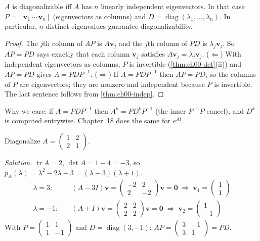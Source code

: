 \begin{theorem}\label{thm:ch00-diag}
$A$ is diagonalizable iff $A$ has $n$ linearly independent eigenvectors. In
that case $P = [\mathbf{v}_1\,\cdots\,\mathbf{v}_n]$ (eigenvectors as columns)
and $D = \operatorname{diag}(\lambda_1,\dots,\lambda_n)$. In particular, $n$
distinct eigenvalues guarantee diagonalizability.
\end{theorem}
\begin{proof}
The $j$th column of $AP$ is $A\mathbf{v}_j$ and the $j$th column of $PD$ is
$\lambda_j\mathbf{v}_j$. So $AP = PD$ says exactly that each column
$\mathbf{v}_j$ satisfies $A\mathbf{v}_j = \lambda_j\mathbf{v}_j$.
($\Leftarrow$) With independent eigenvectors as columns, $P$ is invertible
(\cref{thm:ch00-det}(ii)) and $AP=PD$ gives $A = PDP^{-1}$. ($\Rightarrow$) If
$A = PDP^{-1}$ then $AP = PD$, so the columns of $P$ are eigenvectors; they are
nonzero and independent because $P$ is invertible. The last sentence follows
from \cref{thm:ch00-indep}.
\end{proof}

Why we care: if $A = PDP^{-1}$ then $A^k = PD^kP^{-1}$ (the inner
$P^{-1}P$ cancel), and $D^k$ is computed entrywise. Chapter~18 does the same
for $e^{At}$.

\begin{example}\label{ex:ch00-diag}
Diagonalize $A = \begin{pmatrix}1&2\\2&1\end{pmatrix}$.

\emph{Solution.} $\operatorname{tr}A = 2$, $\det A = 1 - 4 = -3$, so
$p_A(\lambda) = \lambda^2 - 2\lambda - 3 = (\lambda-3)(\lambda+1)$.
\begin{align*}
  \lambda = 3:&\quad (A-3I)\mathbf v = \begin{pmatrix}-2&2\\2&-2\end{pmatrix}\mathbf v = \mathbf0
     \;\Rightarrow\; \mathbf v_1 = \begin{pmatrix}1\\1\end{pmatrix}\\
  \lambda = -1:&\quad (A+I)\mathbf v = \begin{pmatrix}2&2\\2&2\end{pmatrix}\mathbf v = \mathbf0
     \;\Rightarrow\; \mathbf v_2 = \begin{pmatrix}1\\-1\end{pmatrix}
\end{align*}
With $P = \left(\begin{smallmatrix}1&1\\1&-1\end{smallmatrix}\right)$ and
$D = \operatorname{diag}(3,-1)$: $AP = \left(\begin{smallmatrix}3&-1\\3&1\end{smallmatrix}\right) = PD$. \checkmark
\end{example}


